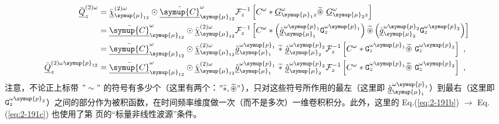 \begin{subequations} \label{eq:2-191}
	\abovedisplayskip=13pt
	\belowdisplayskip=13pt
	\begin{align}
		\bar{\underline{Q}}^{(2)\omega}_{z} &= \bar{\underline{\chi}}^{(2)\omega}_{{\symup{\mu}}_{12}} \odot \bar{\underline{\symup{C}}}^{\omega}_{{\symup{\mu}}_{12}} \mathcal F^{-1}_{z} \left[ C^{\omega} * \underline{G}^{\omega}_{{\symup{\mu}}_1 z} \widetilde \circledast\ \underline{G}^{\omega}_{{\symup{\mu}}_2 z} \right] \label{eq:2-191a} \\ &= \bar{\underline{\symup{C}}}^{\omega}_{{\symup{\mu}}_{12}} \odot \bar{\underline{\chi}}^{(2)\omega}_{{\symup{\mu}}_{12}} \mathcal F^{-1}_{z} \left[ C^{\omega} * \left( \hat{\underline{g}}^{\omega{\symup{p}}_{1}}_{{\symup{\mu}}_1} {\mathtt{G}}^{\omega{\symup{p}}_{1}}_{z} \right) \widetilde \circledast \left( \hat{\underline{g}}^{\omega{\symup{p}}_{2}}_{{\symup{\mu}}_2} {\mathtt{G}}^{\omega{\symup{p}}_{2}}_{z} \right) \right] \label{eq:2-191b} \\ &= \bar{\underline{\symup{C}}}^{\omega}_{{\symup{\mu}}_{12}} \odot \bar{\underline{\chi}}^{(2)\omega}_{{\symup{\mu}}_{12}} \hat{\underline{g}}^{\omega{\symup{p}}_{1}}_{{\symup{\mu}}_1} \ \widetilde *\ \hat{\underline{g}}^{\omega{\symup{p}}_{2}}_{{\symup{\mu}}_2} \mathcal F^{-1}_{z} \left[ C^{\omega} * {\mathtt{G}}^{\omega{\symup{p}}_{1}}_{z} \widetilde \circledast\ {\mathtt{G}}^{\omega{\symup{p}}_{2}}_{z} \right] \label{eq:2-191c}~, \\ \bar{\underline{Q}}^{(2)\omega{\symup{p}}_{12}}_{z} &= \bar{\underline{\symup{C}}}^{\omega}_{{\symup{\mu}}_{12}} \odot \bar{\underline{\chi}}^{(2)\omega}_{{\symup{\mu}}_{12}} \hat{\underline{g}}^{\omega{\symup{p}}_{1}}_{{\symup{\mu}}_1} \ \widetilde *\ \hat{\underline{g}}^{\omega{\symup{p}}_{2}}_{{\symup{\mu}}_2} \mathcal F^{-1}_{z} \left[ C^{\omega} * {\mathtt{G}}^{\omega{\symup{p}}_{1}}_{z} \widetilde \circledast\ {\mathtt{G}}^{\omega{\symup{p}}_{2}}_{z} \right] \label{eq:2-191d}~,
	\end{align}
\end{subequations}
注意，不论正上标带 $"\sim"$ 的符号有多少个（这里有两个：$"\widetilde *, \widetilde \circledast"$），只对这些符号所作用的最左（这里即 $\hat{\underline{g}}^{\omega{\symup{p}}_{1}}_{{\symup{\mu}}_1}$）到最右（这里即 ${\mathtt{G}}^{\omega{\symup{p}}_{2}}_{z}$）之间的部分作为被积函数，在时间频率维度做一次（而不是多次）一维卷积积分。此外，这里的 Eq.(\ref{eq:2-191b}) $\to$ Eq.(\ref{eq:2-191c}) 也使用了第 \pageref{con:3} 页的“标量非线性波源”条件。%

